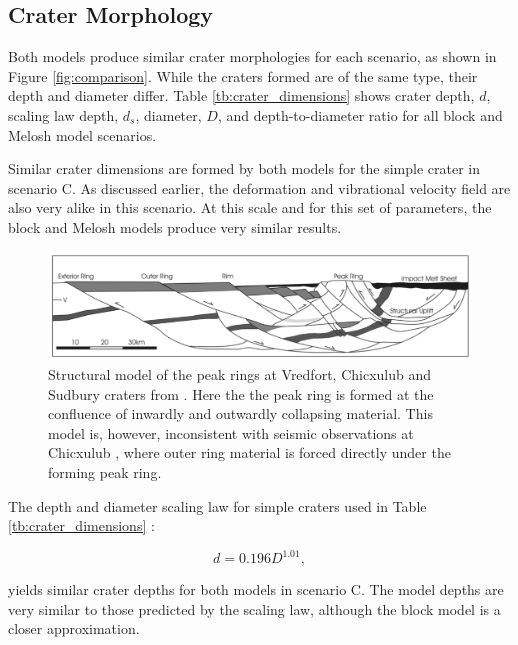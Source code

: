 \subsection{Crater Morphology}



Both models produce similar crater morphologies for each scenario, as shown in Figure \ref{fig:comparison}. While the craters formed are of the same type, their depth and diameter differ. Table \ref{tb:crater_dimensions} shows crater depth, $d$, scaling law depth, $d_{s}$, diameter, $D$, and depth-to-diameter ratio for all block and Melosh model scenarios. 

Similar crater dimensions are formed by both models for the simple crater in scenario C. As discussed earlier, the deformation and vibrational velocity field are also very alike in this scenario. At this scale and for this set of parameters, the block and Melosh models produce very similar results.

\begin{figure}[bp]

\includegraphics[width=\linewidth]{images/grieve_model.png}
\caption{Structural model of the peak rings at Vredfort, Chicxulub and Sudbury craters from \citet{grieve2008observations}. Here the the peak ring is formed at the confluence of inwardly and outwardly collapsing material. This model is, however, inconsistent with seismic observations at Chicxulub \citep{morgan2011full}, where outer ring material is forced directly under the forming peak ring.}\label{fig:grieve_model}
\end{figure}

The depth and diameter scaling law for simple craters used in Table \ref{tb:crater_dimensions} \citep{pike1977apparent}:

\vspace{-0.2cm}
\begin{equation}\label{eq:simple_scaling}
d=0.196 D^{1.01},
\end{equation}

yields similar crater depths for both models in scenario C. The model depths are very similar to those predicted by the scaling law, although the block model is a closer approximation.

